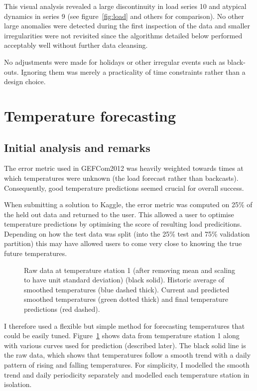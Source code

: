 \documentclass[preprint,authoryear,12pt]{elsarticle}
\begin{document}
This visual analysis revealed a large discontinuity in load series 10 and atypical dynamics in series 9 (see figure~\ref{fig:load} and others for comparison).
No other large anomalies were detected during the first inspection of the data and smaller irregularities were not revisited since the algorithms detailed below performed acceptably well without further data cleansing.

No adjustments were made for holidays or other irregular events such as black-outs.
Ignoring them was merely a practicality of time constraints rather than a design choice.

\section{Temperature forecasting}

\label{sec:temp}

\subsection{Initial analysis and remarks}

The error metric used in GEFCom2012 was heavily weighted towards times at which temperatures were unknown (\ie the load forecast rather than backcasts).
Consequently, good temperature predictions seemed crucial for overall success.

When submitting a solution to Kaggle, the error metric was computed on 25\% of the held out data and returned to the user.
This allowed a user to optimise temperature predictions by optimising the score of resulting load predicitions.
Depending on how the test data was split (into the 25\% test and 75\% validation partition) this may have allowed users to come very close to knowing the true future temperatures.

\begin{figure}[ht]
  \begin{center}
    
  \end{center}
  \caption{Raw data at temperature station 1 (after removing mean and scaling to have unit standard deviation) (black solid). Historic average of smoothed temperatures (blue dashed thick). Current and predicted smoothed temperatures (green dotted thick) and final temperature predictions (red dashed).}
  \label{fig:temp_pred}
\end{figure}

I therefore used a flexible but simple method for forecasting temperatures that could be easily tuned.
Figure~\ref{fig:temp_pred} shows data from temperature station 1 along with various curves used for prediction (described later).
The black solid line is the raw data, which shows that temperatures follow a smooth trend with a daily pattern of rising and falling temperatures.
For simplicity, I modelled the smooth trend and daily periodicity separately and modelled each temperature station in isolation.
\end{document}
